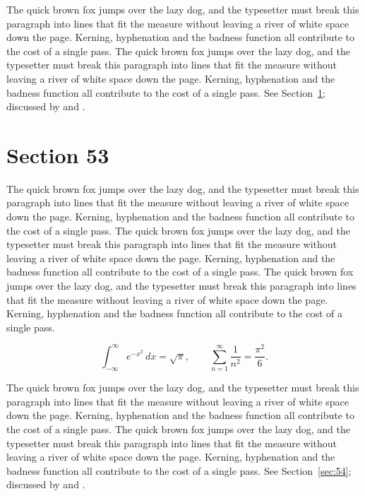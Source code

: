 \documentclass{article}
\begin{document}
The quick brown fox jumps over the lazy dog, and the typesetter must break this paragraph into lines that fit the measure without leaving a river of white space down the page. Kerning, hyphenation and the badness function all contribute to the cost of a single pass. The quick brown fox jumps over the lazy dog, and the typesetter must break this paragraph into lines that fit the measure without leaving a river of white space down the page. Kerning, hyphenation and the badness function all contribute to the cost of a single pass. 
See Section~\ref{sec:53}; discussed by \textcite{k3} and \textcite{l5}.
\section{Section 53}
\label{sec:53}
The quick brown fox jumps over the lazy dog, and the typesetter must break this paragraph into lines that fit the measure without leaving a river of white space down the page. Kerning, hyphenation and the badness function all contribute to the cost of a single pass. The quick brown fox jumps over the lazy dog, and the typesetter must break this paragraph into lines that fit the measure without leaving a river of white space down the page. Kerning, hyphenation and the badness function all contribute to the cost of a single pass. The quick brown fox jumps over the lazy dog, and the typesetter must break this paragraph into lines that fit the measure without leaving a river of white space down the page. Kerning, hyphenation and the badness function all contribute to the cost of a single pass. 

\begin{equation}\label{eq:53}
\int_{-\infty}^{\infty} e^{-x^{2}}\,dx = \sqrt{\pi}, \qquad
\sum_{n=1}^{\infty} \frac{1}{n^{2}} = \frac{\pi^{2}}{6}.
\end{equation}

The quick brown fox jumps over the lazy dog, and the typesetter must break this paragraph into lines that fit the measure without leaving a river of white space down the page. Kerning, hyphenation and the badness function all contribute to the cost of a single pass. The quick brown fox jumps over the lazy dog, and the typesetter must break this paragraph into lines that fit the measure without leaving a river of white space down the page. Kerning, hyphenation and the badness function all contribute to the cost of a single pass. 
See Section~\ref{sec:54}; discussed by \textcite{k4} and \textcite{l1}.
\end{document}

